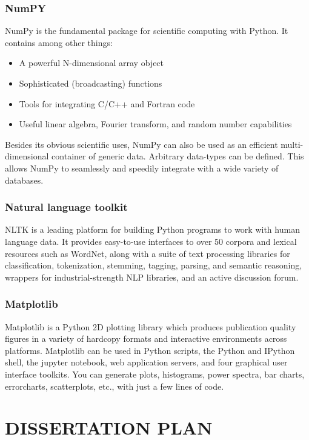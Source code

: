 \documentclass[oneside,a4paper,12pt]{pictreport}
\begin{document}
\subsection{NumPY}


NumPy is the fundamental package for scientific computing with Python. It contains among other things:
\begin{itemize}
\item A powerful N-dimensional array object
\item Sophisticated (broadcasting) functions
\item Tools for integrating C/C++ and Fortran code
\item Useful linear algebra, Fourier transform, and random number capabilities
\end{itemize}
Besides its obvious scientific uses, NumPy can also be used as an efficient multi-dimensional container of generic data. Arbitrary data-types can be defined. This allows NumPy to seamlessly and speedily integrate with a wide variety of databases.

\subsection{Natural language toolkit}
NLTK is a leading platform for building Python programs to work with human language data. It provides easy-to-use interfaces to over 50 corpora and lexical resources such as WordNet, along with a suite of text processing libraries for classification, tokenization, stemming, tagging, parsing, and semantic reasoning, wrappers for industrial-strength NLP libraries, and an active discussion forum.

\subsection{Matplotlib}
Matplotlib is a Python 2D plotting library which produces publication quality figures in a variety of hardcopy formats and interactive environments across platforms. Matplotlib can be used in Python scripts, the Python and IPython shell, the jupyter notebook, web application servers, and four graphical user interface toolkits. You can generate plots, histograms, power spectra, bar charts, errorcharts, scatterplots, etc., with just a few lines of code.

\chapter{DISSERTATION PLAN}
\end{document}
